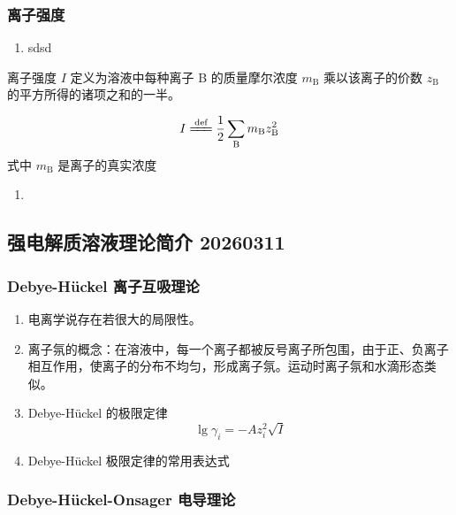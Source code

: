 \subsubsection{离子强度}

\begin{enumerate}
    \item sdsd
\end{enumerate}

\begin{definition}
    离子强度 $I$ 定义为溶液中每种离子 B 的质量摩尔浓度 $m_\mathrm{B}$ 乘以该离子的价数 $z_\mathrm{B}$ 的平方所得的诸项之和的一半。

    \begin{equation}
        I \xlongequal{\text{def}} \frac{1}{2} \sum_{\mathrm{B}} m_\mathrm{B}z_\mathrm{B}^2
    \end{equation}
    式中 $m_{\mathrm{B}}$ 是离子的真实浓度
\end{definition}

\begin{enumerate}[resume]
    \item 
\end{enumerate}

\subsection{强电解质溶液理论简介 20260311}

\subsubsection{Debye-Hückel 离子互吸理论}

\begin{enumerate}
    \item 电离学说存在若很大的局限性。
    \item 离子氛的概念：在溶液中，每一个离子都被反号离子所包围，由于正、负离子相互作用，使离子的分布不均匀，形成离子氛。运动时离子氛和水滴形态类似。
    
    \item Debye-Hückel 的极限定律
    \begin{equation}
        \lg{\gamma_i} = -A z_i^2 \sqrt{I}
    \end{equation}
    
    \item  Debye-Hückel 极限定律的常用表达式
\end{enumerate}

\subsubsection{Debye-Hückel-Onsager 电导理论}

